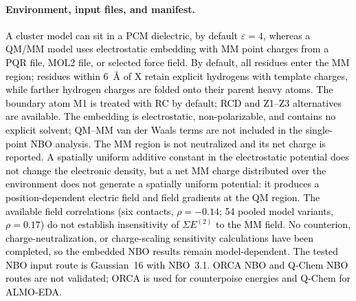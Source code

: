 \documentclass[journal=jcisd8,manuscript=article,layout=two-column]{achemso}
\newcommand{\tcb}[1]{{\textcolor{black}{#1}}}
\newcommand{\BX}{BondX Studio}
\begin{document}
\paragraph{Environment, input files, and manifest.}
\tcb{A cluster model can sit in a PCM dielectric, by default $\varepsilon=4$, whereas a QM/MM model uses electrostatic embedding with MM point charges from a PQR file, MOL2 file, or selected force field. By default, all residues enter the MM region; residues within 6~\AA{} of X retain explicit hydrogens with template charges, while farther hydrogen charges are folded onto their parent heavy atoms. The boundary atom M1 is treated with RC by default; RCD and Z1--Z3 alternatives are available. The embedding is electrostatic, non-polarizable, and contains no explicit solvent; QM--MM van der Waals terms are not included in the single-point NBO analysis. The MM region is not neutralized and its net charge is reported. A spatially uniform additive constant in the electrostatic potential does not change the electronic density, but a net MM charge distributed over the environment does not generate a spatially uniform potential: it produces a position-dependent electric field and field gradients at the QM region. The available field correlations (six contacts, $\rho=-0.14$; 54 pooled model variants, $\rho=0.17$) do not establish insensitivity of $\Sigma E^{(2)}$ to the MM field. No counterion, charge-neutralization, or charge-scaling sensitivity calculations have been completed, so the embedded NBO results remain model-dependent. The tested NBO input route is Gaussian~16 with NBO~3.1. ORCA NBO and Q-Chem NBO routes are not validated; ORCA is used for counterpoise energies and Q-Chem for ALMO-EDA.}
\end{document}
